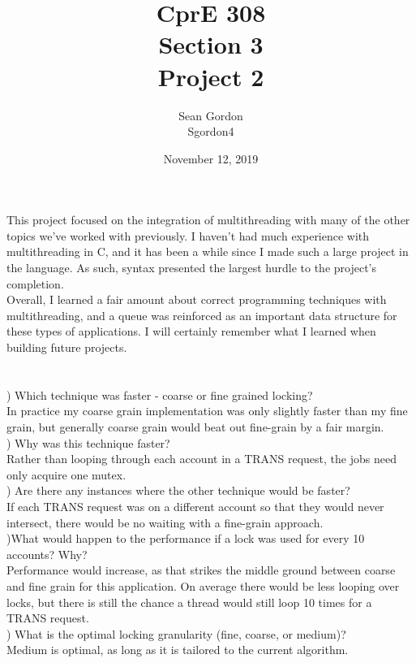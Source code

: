 \documentclass[12pt]{article}
\title{CprE 308\\Section 3\\Project 2}
\author{Sean Gordon\\Sgordon4}
\date{November 12, 2019}
\begin{document}
\maketitle

\noindent This project focused on the integration of multithreading with many of the other topics we've worked with previously. I haven't had much experience with multithreading in C, and it has been a while since I made such a large project in the language. As such, syntax presented the largest hurdle to the project's completion.\\

\noindent Overall, I learned a fair amount about correct programming techniques with multithreading, and a queue was reinforced as an important data structure for these types of applications. I will certainly remember what I learned when building future projects.\\\\\\

) Which technique was faster - coarse or fine grained locking?\\
In practice my coarse grain implementation was only slightly faster than my fine grain, but generally coarse grain would beat out fine-grain by a fair margin.\\


) Why was this technique faster?\\
Rather than looping through each account in a TRANS request, the jobs need only acquire one mutex.\\


) Are there any instances where the other technique would be faster?\\
If each TRANS request was on a different account so that they would never intersect, there  would be no waiting with a fine-grain approach.\\


)What would happen to the performance if a lock was used for every 10 accounts? Why?\\
Performance would increase, as that strikes the middle ground between coarse and fine grain for this application. On average there would be less looping over locks, but there is still the chance a thread would still loop 10 times for a TRANS request.\\


) What is the optimal locking granularity (fine, coarse, or medium)?\\
Medium is optimal, as long as it is tailored to the current algorithm.
\end{document}
